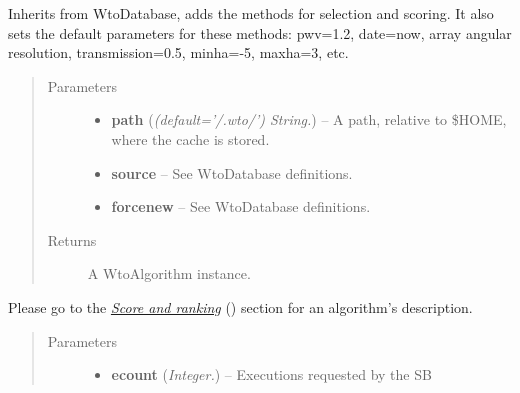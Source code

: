 \documentclass[a4paper,10pt,english]{sphinxmanual}
\begin{document}
\begin{fulllineitems}
\label{wtoapi:wtoAlgorithm.WtoAlgorithm}
Inherits from WtoDatabase, adds the methods for selection and scoring.
It also sets the default parameters for these methods: pwv=1.2, date=now,
array angular resolution, transmission=0.5, minha=-5, maxha=3, etc.
\begin{quote}\begin{description}
\item[{Parameters}] \leavevmode\begin{itemize}
\item {} 
\textbf{path} (\emph{(default='/.wto/') String.}) -- A path, relative to \$HOME, where the cache is stored.

\item {} 
\textbf{source} -- See WtoDatabase definitions.

\item {} 
\textbf{forcenew} -- See WtoDatabase definitions.

\end{itemize}

\item[{Returns}] \leavevmode
A WtoAlgorithm instance.

\end{description}\end{quote}

\begin{fulllineitems}
\label{wtoapi:wtoAlgorithm.WtoAlgorithm.calculate_score}
Please go to the {\hyperref[algorithm:score]{\emph{Score and ranking}}} () section for an
algorithm's description.
\begin{quote}\begin{description}
\item[{Parameters}] \leavevmode\begin{itemize}
\item {} 
\textbf{ecount} (\emph{Integer.}) -- Executions requested by the SB


\end{itemize}
\end{description}
\end{quote}
\end{fulllineitems}
\end{fulllineitems}
\end{document}
